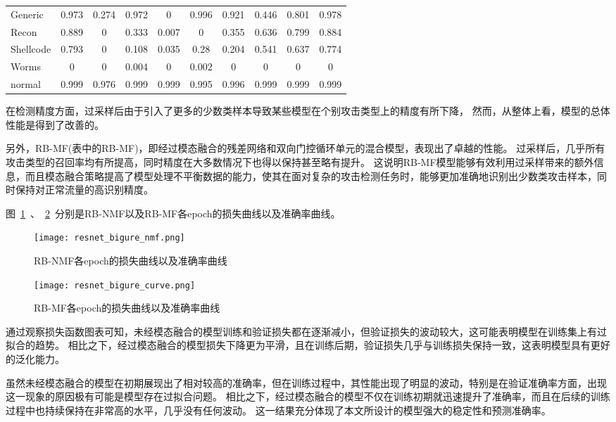 \begin{table}[htbp]
\begin{tabular}{lccccccccc}
		Generic   & 0.973 & 0.274 & 0.972 & 0     & 0.996 & 0.921 & 0.446 & 0.801  & 0.978 \\
		Recon     & 0.889 & 0     & 0.333 & 0.007 & 0     & 0.355 & 0.636 & 0.799  & 0.884 \\
		Shellcode & 0.793 & 0     & 0.108 & 0.035 & 0.28  & 0.204 & 0.541 & 0.637  & 0.774 \\
		Worms     & 0     & 0     & 0.004 & 0     & 0.002 & 0     & 0     & 0      & 0     \\
		normal    & 0.999 & 0.976 & 0.999 & 0.999 & 0.995 & 0.996 & 0.999 & 0.999  & 0.999 \\
		\bottomrule
	\end{tabular}
\end{table}
在检测精度方面，过采样后由于引入了更多的少数类样本导致某些模型在个别攻击类型上的精度有所下降，
然而，从整体上看，模型的总体性能是得到了改善的。\par

另外，RB-MF(表中的RB-MF)，即经过模态融合的残差网络和双向门控循环单元的混合模型，表现出了卓越的性能。
过采样后，几乎所有攻击类型的召回率均有所提高，同时精度在大多数情况下也得以保持甚至略有提升。
这说明RB-MF模型能够有效利用过采样带来的额外信息，而且模态融合策略提高了模型处理不平衡数据的能力，使其在面对复杂的攻击检测任务时，能够更加准确地识别出少数类攻击样本，同时保持对正常流量的高识别精度。\par


图~\ref{fig:ResNet-BiGRU-NoFusion-loss}~、~\ref{fig:ResNet-BiGRU-Fusion-loss}~分别是RB-NMF以及RB-MF各epoch的损失曲线以及准确率曲线。
\begin{figure}[htbp]
	\centering
	\texttt{[image: resnet\_bigure\_nmf.png]}
	\caption{RB-NMF各epoch的损失曲线以及准确率曲线}
	\label{fig:ResNet-BiGRU-NoFusion-loss}
\end{figure}
\begin{figure}[htbp]
	\centering
	\texttt{[image: resnet\_bigure\_curve.png]}
	\caption{RB-MF各epoch的损失曲线以及准确率曲线}
	\label{fig:ResNet-BiGRU-Fusion-loss}
\end{figure}
通过观察损失函数图表可知，未经模态融合的模型训练和验证损失都在逐渐减小，但验证损失的波动较大，这可能表明模型在训练集上有过拟合的趋势。
相比之下，经过模态融合的模型损失下降更为平滑，且在训练后期，验证损失几乎与训练损失保持一致，这表明模型具有更好的泛化能力。\par
虽然未经模态融合的模型在初期展现出了相对较高的准确率，但在训练过程中，其性能出现了明显的波动，特别是在验证准确率方面，出现这一现象的原因极有可能是模型存在过拟合问题。
相比之下，经过模态融合的模型不仅在训练初期就迅速提升了准确率，而且在后续的训练过程中也持续保持在非常高的水平，几乎没有任何波动。
这一结果充分体现了本文所设计的模型强大的稳定性和预测准确率。\par

